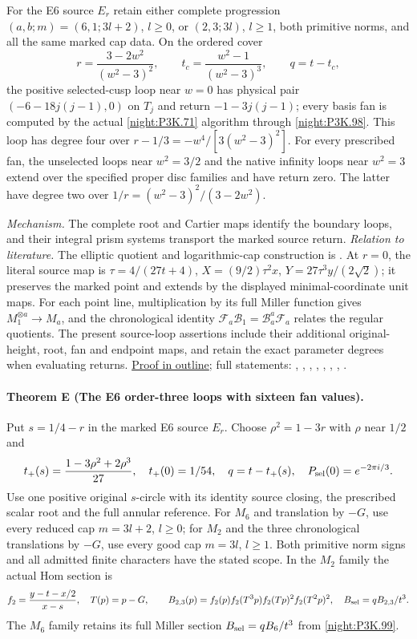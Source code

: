 For the E6 source $E_r$ retain either complete progression
$(a,b;m)=(6,1;3l+2)$, $l\ge0$, or $(2,3;3l)$, $l\ge1$,
both primitive norms, and all the same marked cap data.
On the ordered cover
\[
 r=\frac{3-2w^2}{(w^2-3)^2},\qquad
 t_c=\frac{w^2-1}{(w^2-3)^3},\qquad q=t-t_c,
\]
the positive selected-cusp loop near $w=0$ has physical pair
$(-6-18j(j-1),0)$ on $T_j$ and return $-1-3j(j-1)$;
every basis fan is computed by the actual \cref{night:P3K.71}
algorithm through \cref{night:P3K.98}. This loop has degree four
over $r-1/3=-w^4/[3(w^2-3)^2]$.
For every prescribed fan, the unselected loops near $w^2=3/2$
and the native infinity loops near $w^2=3$ extend over the
specified proper disc families and have return zero. The latter
have degree two over $1/r=(w^2-3)^2/(3-2w^2)$.

\textit{Mechanism.} The complete root and Cartier maps identify the boundary loops,
and their integral prism systems transport the marked source return.
\textit{Relation to literature.} The elliptic quotient and logarithmic-cap construction is \cite[Section~2 and Remark~8.5]{Engel2026}. At $r=0$, the literal source map is $\tau=4/(27t+4)$, $X=(9/2)\tau^2x$, $Y=27\tau^3y/(2\sqrt2)$; it preserves the marked point and extends by the displayed minimal-coordinate unit maps. For each point line, multiplication by its full Miller function gives $M_1^{\otimes a}\to M_a$, and the chronological identity $\mathcal F_a\mathcal B_1=\mathcal B_a^a\mathcal F_a$ relates the regular quotients. The present source-loop assertions include their additional original-height, root, fan and endpoint maps, and retain the exact parameter degrees when evaluating returns.
\hyperlink{outline-IV-D}{Proof in outline}; full statements: , , , , , , , .

\hypertarget{main-IV-E}{}
\paragraph{Theorem E (The E6 order-three loops with sixteen fan values).}
\label{series:IV:E}
Put $s=1/4-r$ in the marked E6 source $E_r$. Choose
$\rho^2=1-3r$ with $\rho$ near $1/2$ and
\[
 t_+(s)=\frac{1-3\rho^2+2\rho^3}{27},\quad
 t_+(0)=1/54,\quad q=t-t_+(s),\quad
 P_{\rm sel}(0)=e^{-2\pi i/3}.
\]
Use one positive original $s$-circle with its identity source
closing, the prescribed scalar root and the full annular reference.
For $M_6$ and translation by $-G$, use every reduced cap
$m=3l+2$, $l\ge0$; for $M_2$ and the three chronological
translations by $-G$, use every good cap $m=3l$, $l\ge1$.
Both primitive norm signs and all admitted finite characters have
the stated scope. In the $M_2$ family the actual Hom section is
\[
 f_2=\frac{y-t-x/2}{x-s},\quad T(p)=p-G,\qquad
 B_{2,3}(p)=f_2(p)f_2(T^3p)f_2(Tp)^2f_2(T^2p)^2,
 \quad B_{\rm sel}=qB_{2,3}/t^3.
\]
The $M_6$ family retains its full Miller section
$B_{\rm sel}=qB_6/t^3$ from \cref{night:P3K.99}.

